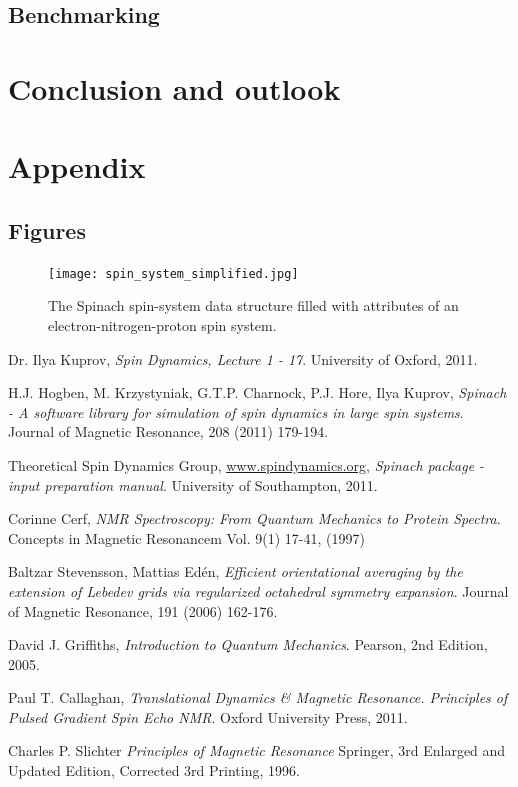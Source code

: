 \documentclass[11.5pt,a4paper]{article}
\begin{document}
\subsection{Benchmarking}

\section{Conclusion and outlook}

\section{Appendix}
\subsection{Figures}

\begin{figure}
  \centering
 \texttt{[image: spin\_system\_simplified.jpg]}
  \caption{The Spinach spin-system data structure filled with attributes of an electron-nitrogen-proton spin system.}
\end{figure}


\FloatBarrier
\begin{thebibliography}{9}
  Dr. Ilya Kuprov,
  \emph{Spin Dynamics, Lecture 1 - 17}.
  University of Oxford,
  2011.

  H.J. Hogben, M. Krzystyniak, G.T.P. Charnock, P.J. Hore, Ilya Kuprov,
  \emph{Spinach - A software library for simulation of spin dynamics in large spin systems}.
  Journal of Magnetic Resonance,
  208 (2011) 179-194.

  Theoretical Spin Dynamics Group, \url{www.spindynamics.org}, 
  \emph{Spinach package - input preparation manual}.
  University of Southampton, 
  2011.

  Corinne Cerf,
  \emph{NMR Spectroscopy: From Quantum Mechanics to Protein Spectra}.
  Concepts in Magnetic Resonancem Vol. 9(1) 17-41, (1997)

  Baltzar Stevensson, Mattias Ed\'en,
  \emph{Efficient orientational averaging by the extension of Lebedev grids via regularized octahedral symmetry expansion}.
  Journal of Magnetic Resonance,
  191 (2006) 162-176.

  David J. Griffiths,
  \emph{Introduction to Quantum Mechanics}.
  Pearson, 
  2nd Edition, 
  2005.

  Paul T. Callaghan,
  \emph{Translational Dynamics \& Magnetic Resonance. Principles of Pulsed Gradient Spin Echo NMR}.
  Oxford University Press,
  2011.

  Charles P. Slichter
  \emph{Principles of Magnetic Resonance}
  Springer,
  3rd Enlarged and Updated Edition, Corrected 3rd Printing,
  1996.

\end{thebibliography}
\end{document}
